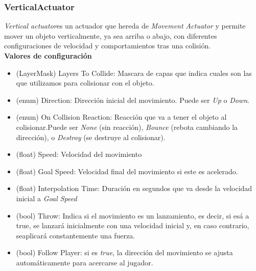 \subsubsection{VerticalActuator}
\textit{Vertical actuator}es un actuador que hereda de \textit{Movement Actuator} y permite mover un objeto verticalmente, ya sea arriba o abajo, con diferentes configuraciones de velocidad y comportamientos tras una colisión.\\
\textbf{Valores de configuración}
\begin{itemize}
	\item (LayerMask) Layers To Collide: Mascara de capas que indica cuales son las que utilizamos para colisionar con el objeto.
	\item (enum) Direction: Dirección inicial del movimiento. Puede ser \textit{Up} o \textit{Down}.
	\item (enum) On Collision Reaction: Reacción que va a tener el objeto al colisionar.Puede ser \textit{None} (sin reacción), \textit{Bounce} (rebota cambiando la dirección), o \textit{Destroy} (se destruye al colisionar).
	\item (float) Speed: Velocidad del movimiento
	\item (float) Goal Speed: Velocidad final del movimiento si este es acelerado.
	\item (float) Interpolation Time: Duración en segundos que va desde la velocidad inicial a \textit{Goal Speed}
	\item (bool) Throw: Indica si el movimiento es un lanzamiento, es decir, si esá a true, se lanzará inicialmente con una velocidad inicial y, en caso contrario, seaplicará constantemente una fuerza.
	\item (bool) Follow Player: si es \textit{true}, la dirección del movimiento se ajusta automáticamente para acercarse al jugador.
\end{itemize}

